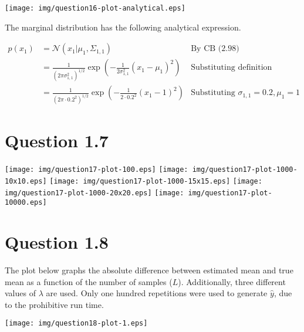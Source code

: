 \documentclass[a4paper, oneside, final]{memoir}
\begin{document}
\texttt{[image: img/question16-plot-analytical.eps]}

The marginal distribution has the following analytical expression.

\begin{align*}
  p(x_1) &= \mathcal{N}(x_1|\mu_1,\Sigma_{1,1}) & \text{By CB (2.98)}\\
  &=
  \frac{1}{(2\pi\sigma_{1,1}^2)^{1/2}}\exp\left({-\frac{1}{2\sigma_{1,1}^2}(x_1-\mu_1)^2}\right)
  & \text{Substituting definition} \\
  &=
  \frac{1}{(2\pi\cdot 0.2^2)^{1/2}}\exp\left({-\frac{1}{2\cdot0.2^2}(x_1-1)^2}\right)
  & \text{Substituting $\sigma_{1,1}=0.2,\mu_1=1$}
\end{align*}

\section*{Question 1.7}

\texttt{[image: img/question17-plot-100.eps]}
\texttt{[image: img/question17-plot-1000-10x10.eps]}
\texttt{[image: img/question17-plot-1000-15x15.eps]}
\texttt{[image: img/question17-plot-1000-20x20.eps]}
\texttt{[image: img/question17-plot-10000.eps]}

\section*{Question 1.8}

The plot below graphs the absolute difference between estimated mean
and true mean as a function of the number of samples ($L$).
Additionally, three different values of $\lambda$ are used.  Only one
hundred repetitions were used to generate $\hat{y}$, due to the
prohibitive run time.

\texttt{[image: img/question18-plot-1.eps]}
\end{document}
